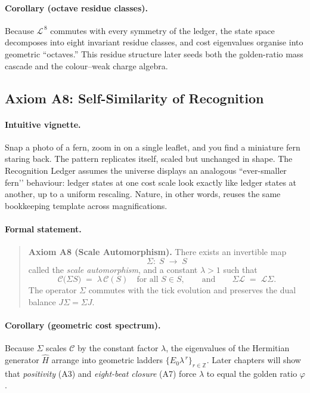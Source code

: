 \documentclass[11pt]{article}
\begin{document}
\paragraph{Corollary (octave residue classes).}
Because \(\mathcal{L}^{\,8}\) commutes with every symmetry of the ledger, the state space decomposes into eight invariant residue classes, and cost eigenvalues organise into geometric “octaves.” This residue structure later seeds both the golden-ratio mass cascade and the colour–weak charge algebra.

\subsection{Axiom A8: Self-Similarity of Recognition}
\label{subsec:axiom-a8}

\paragraph{Intuitive vignette.}
Snap a photo of a fern, zoom in on a single leaflet, and you find a miniature fern staring back.  The pattern replicates itself, scaled but unchanged in shape.  The Recognition Ledger assumes the universe displays an analogous “ever-smaller fern’’ behaviour: ledger states at one cost scale look exactly like ledger states at another, up to a uniform rescaling.  Nature, in other words, reuses the same bookkeeping template across magnifications.

\paragraph{Formal statement.}
\begin{quote}
\textbf{Axiom A8 (Scale Automorphism).}  
There exists an invertible map
\[
\Sigma:\;S \;\longrightarrow\; S
\]
called the \emph{scale automorphism}, and a constant \(\lambda > 1\) such that
\[
\mathcal{C}\!\bigl(\Sigma S\bigr) \;=\; \lambda\,\mathcal{C}(S)
\quad\text{for all } S\in S,
\qquad\text{and}\qquad
\Sigma \mathcal{L}\;=\;\mathcal{L}\Sigma .
\]
The operator \(\Sigma\) commutes with the tick evolution and preserves the dual balance \(J\Sigma=\Sigma J\).
\end{quote}

\paragraph{Corollary (geometric cost spectrum).}
Because \(\Sigma\) scales \(\mathcal{C}\) by the constant factor \(\lambda\), the eigenvalues of the Hermitian generator \(\widehat{H}\) arrange into geometric ladders \(\{E_{0}\lambda^{\,r}\}_{r\in\mathbb{Z}}\).  Later chapters will show that \emph{positivity} (A3) and \emph{eight-beat closure} (A7) force \(\lambda\) to equal the golden ratio \(\varphi\).
\end{document}
